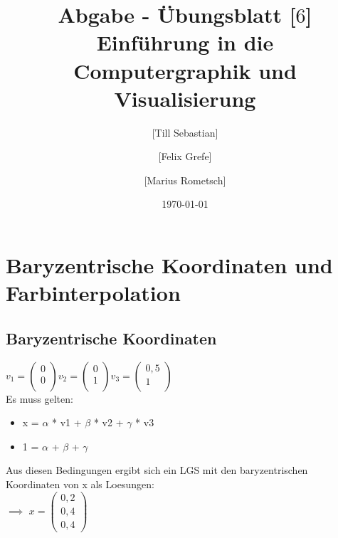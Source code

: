 \documentclass[10pt,a4paper]{article}
\begin{document}
\title{Abgabe - Übungsblatt [$6$]\\
\small{Einführung in die Computergraphik und Visualisierung}}
\author{ [Till Sebastian] \and [Felix Grefe] \and [Marius Rometsch]}
\date{\today}
\maketitle



\section{Baryzentrische Koordinaten und Farbinterpolation}

\subsection{Baryzentrische Koordinaten}

$
v_1 =\begin{pmatrix}
0 \\
0 \\

\end{pmatrix}
$$
v_2 =\begin{pmatrix}
0 \\
1 \\

\end{pmatrix}
$$
v_3 =\begin{pmatrix}
	0,5 \\
	1\\
	 
\end{pmatrix}
$\\
Es muss gelten:

\begin{itemize}
 \item  x = $\alpha$ * v1 + $\beta$ * v2 + $\gamma$ * v3
 \item  1 = $\alpha$ + $\beta$ + $\gamma$
\end{itemize}
Aus diesen Bedingungen ergibt sich ein LGS mit den baryzentrischen Koordinaten von x als Loesungen:
\\
$\implies$
$
x =\begin{pmatrix}
0,2 \\
0,4 \\
0,4 
\end{pmatrix}
$
\end{document}
